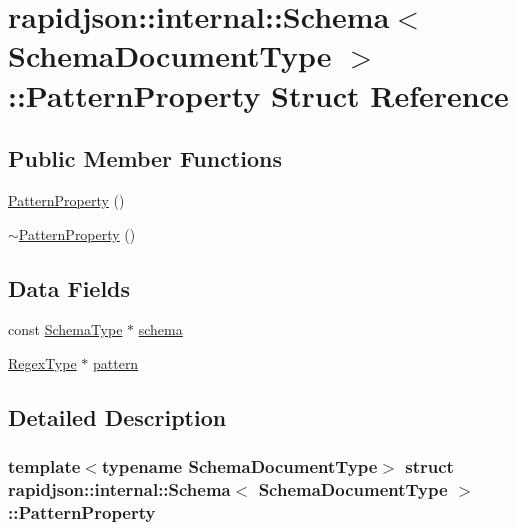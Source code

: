 \hypertarget{structrapidjson_1_1internal_1_1_schema_1_1_pattern_property}{}\section{rapidjson\+::internal\+::Schema$<$ Schema\+Document\+Type $>$\+::Pattern\+Property Struct Reference}
\label{structrapidjson_1_1internal_1_1_schema_1_1_pattern_property}
\subsection*{Public Member Functions}
\begin{DoxyCompactItemize}
\item 
\mbox{\hyperlink{structrapidjson_1_1internal_1_1_schema_1_1_pattern_property_a19a12a85a9b124f81c442f9743523b05}{Pattern\+Property}} ()
\item 
\mbox{\hyperlink{structrapidjson_1_1internal_1_1_schema_1_1_pattern_property_a7084ac2952c345091d0d9ec1880feecc}{$\sim$\+Pattern\+Property}} ()
\end{DoxyCompactItemize}
\subsection*{Data Fields}
\begin{DoxyCompactItemize}
\item 
const \mbox{\hyperlink{classrapidjson_1_1internal_1_1_schema_a62e03be17971648a9d614244ffcb0f10}{Schema\+Type}} $\ast$ \mbox{\hyperlink{structrapidjson_1_1internal_1_1_schema_1_1_pattern_property_aebf1636280c09538973ebfb33387d4c8}{schema}}
\item 
\mbox{\hyperlink{classrapidjson_1_1internal_1_1_schema_a2c16b06523df78f5c354e9a68da90e23}{Regex\+Type}} $\ast$ \mbox{\hyperlink{structrapidjson_1_1internal_1_1_schema_1_1_pattern_property_a2ba2fa4b3800d452e6282c9815ad5a85}{pattern}}
\end{DoxyCompactItemize}


\subsection{Detailed Description}
\subsubsection*{template$<$typename Schema\+Document\+Type$>$\newline
struct rapidjson\+::internal\+::\+Schema$<$ Schema\+Document\+Type $>$\+::\+Pattern\+Property}



